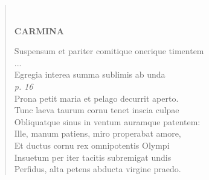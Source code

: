 \documentclass[11pt, a4paper]{report}
\begin{document}
\begin{verse}
        ﻿\pagebreak 
     \marginpar{[50]} \begin{center} \textbf{CARMINA} \end{center}Suspensum et pariter comitique onerique timentem \\ 
                     \lbrack ... \rbrack 
                 \\ Egregia interea summa sublimis ab unda \\ \textit{p. 16} \\ Prona petit maria et pelago decurrit aperto. \\ Tunc laeva taurum cornu tenet inscia culpae \\ Obliquatque sinus in ventum auramque patentem: \\ Ille, manum patiens, miro properabat amore, \\ Et ductus cornu rex omnipotentis Olympi \\ Insuetum per iter tacitis subremigat undis \\ Perfidus, alta petens abducta virgine praedo. \\ 
      \end{verse}
  
\end{document}
